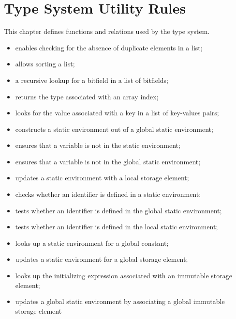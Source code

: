 \chapter{Type System Utility Rules\label{chap:TypeSystemUtilityRules}}

This chapter defines functions and relations used by the type system.

\ChapterOutline
\begin{itemize}
  \item {} enables checking for the absence of duplicate elements in a list;
  \item {} allows sorting a list;
  \item {} a recursive lookup for a bitfield in a list of bitfields;
  \item {} returns the type associated with an array index;
  \item {} looks for the value associated with a key in a list of key-values pairs;
  \item {} constructs a static environment out of a global static environment;
  \item {} ensures that a variable is not in the static environment;
  \item {} ensures that a variable is not in the global static environment;
  \item {} updates a static environment with a local storage element;
  \item {} checks whether an identifier is defined in a static environment;
  \item {} tests whether an identifier is defined in the global static environment;
  \item {} tests whether an identifier is defined in the local static environment;
  \item {} looks up a static environment for a global constant;
  \item {} updates a static environment for a global storage element;
  \item {} looks up the initializing expression associated with an immutable storage element;
  \item {} updates a global static environment by associating a global immutable storage element

\end{itemize}
